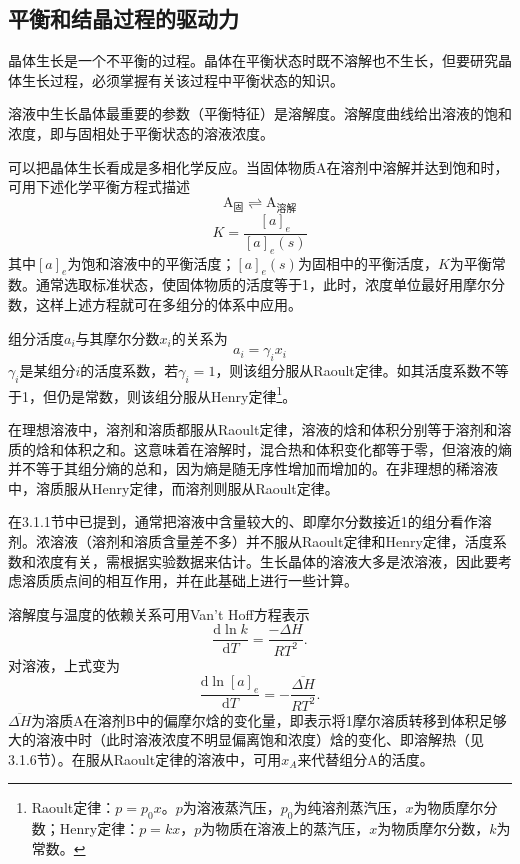 \subsection{平衡和结晶过程的驱动力}
晶体生长是一个不平衡的过程。晶体在平衡状态时既不溶解也不生长，但要研究晶体生长过程，必须掌握有关该过程中平衡状态的知识。

溶液中生长晶体最重要的参数（平衡特征）是溶解度。溶解度曲线给出溶液的饱和浓度，即与固相处于平衡状态的溶液浓度。

可以把晶体生长看成是多相化学反应。当固体物质A在溶剂中溶解并达到饱和时，可用下述化学平衡方程式描述
\begin{equation}
\mathrm{A_{\text{固}} \rightleftharpoons A_{\text{溶解}}}
\end{equation}
\begin{equation}
K=\frac{[a]_e}{[a]_e(s)}
\end{equation}
其中$[a]_e$为饱和溶液中的平衡活度；$[a]_e(s)$为固相中的平衡活度，$K$为平衡常数。通常选取标准状态，使固体物质的活度等于1，此时，浓度单位最好用摩尔分数，这样上述方程就可在多组分的体系中应用。

组分活度$a_i$与其摩尔分数$x_i$的关系为
\begin{equation}
a_i = \gamma_i x_i
\end{equation}
$\gamma_i$是某组分$i$的活度系数，若$\gamma_i=1$，则该组分服从Raoult定律。如其活度系数不等于1，但仍是常数，则该组分服从Henry定律\footnote{Raoult定律：{$p=p_0x$}。{$p$}为溶液蒸汽压，$p_0$为纯溶剂蒸汽压，$x$为物质摩尔分数；Henry定律：$p=kx$，$p$为物质在溶液上的蒸汽压，$x$为物质摩尔分数，$k$为常数。}。

在理想溶液中，溶剂和溶质都服从Raoult定律，溶液的焓和体积分别等于溶剂和溶质的焓和体积之和。这意味着在溶解时，混合热和体积变化都等于零，但溶液的熵并不等于其组分熵的总和，因为熵是随无序性增加而增加的。在非理想的稀溶液中，溶质服从Henry定律，而溶剂则服从Raoult定律。

在3.1.1节中已提到，通常把溶液中含量较大的、即摩尔分数接近1的组分看作溶剂。浓溶液（溶剂和溶质含量差不多）并不服从Raoult定律和Henry定律，活度系数和浓度有关，需根据实验数据来估计。生长晶体的溶液大多是浓溶液，因此要考虑溶质质点间的相互作用，并在此基础上进行一些计算。

溶解度与温度的依赖关系可用Van't Hoff方程表示
\begin{equation}
\frac{\mathrm{d}\ln k}{\mathrm{d}T} = \frac{-\Delta H}{RT^2}.
\end{equation}
对溶液，上式变为
\begin{equation}
\frac{\mathrm{d}\ln [a]_e}{\mathrm{d}T} = -\frac{\overline{\Delta H}}{RT^2}.
\end{equation}
$\overline{\Delta H}$为溶质A在溶剂B中的偏摩尔焓的变化量，即表示将1摩尔溶质转移到体积足够大的溶液中时（此时溶液浓度不明显偏离饱和浓度）焓的变化、即溶解热（见3.1.6节）。在服从Raoult定律的溶液中，可用$x_A$来代替组分A的活度。

